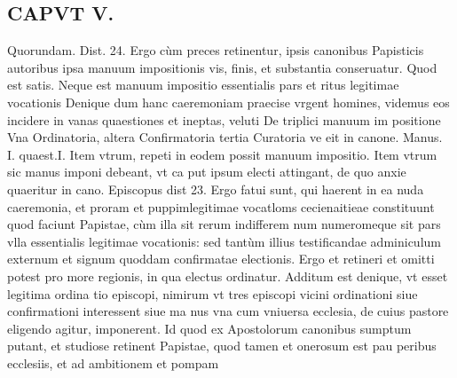 \documentclass{article}
\begin{document}
\begin{pages}
\section*{CAPVT  V. }
\marginpar{[ p.361 ]}\pstart Quorundam. Dist. 24. Ergo cùm preces retinentur, ipsis canonibus Papisticis autoribus ipsa manuum impositionis vis, finis, et substantia conseruatur. Quod est satis. Neque est manuum impositio essentialis pars et ritus legitimae vocationis  \pend\pstart Denique dum hanc caeremoniam praecise vrgent homines, videmus eos incidere in vanas quaestiones et ineptas, veluti De triplici manuum im positione Vna Ordinatoria, altera Confirmatoria tertia Curatoria ve eit in canone. Manus. I. quaest.I.  \pend\pstart Item vtrum, repeti in eodem possit manuum impositio.  \pend\pstart Item vtrum sic manus imponi debeant, vt ca put ipsum electi attingant, de quo anxie quaeritur in cano. Episcopus dist 23. Ergo fatui sunt, qui haerent in ea nuda caeremonia, et proram et puppimlegitimae vocatloms cecienaitieae constituunt quod faciunt Papistae, cùm illa sit rerum indifferem num numeromeque sit pars vlla essentialis legitimae vocationis: sed tantùm illius testificandae adminiculum externum et signum quoddam confirmatae electionis.  \pend\pstart Ergo et retineri et omitti potest pro more regionis, in qua electus ordinatur.  \pend\pstart Additum est denique, vt esset legitima ordina tio episcopi, nimirum vt tres episcopi vicini ordinationi siue confirmationi interessent siue ma nus vna cum vniuersa ecclesia, de cuius pastore eligendo agitur, imponerent. Id quod ex Apostolorum canonibus sumptum putant, et studiose retinent Papistae, quod tamen et onerosum est pau peribus ecclesiis, et ad ambitionem et pompam  \pend

\end{pages}
\end{document}
